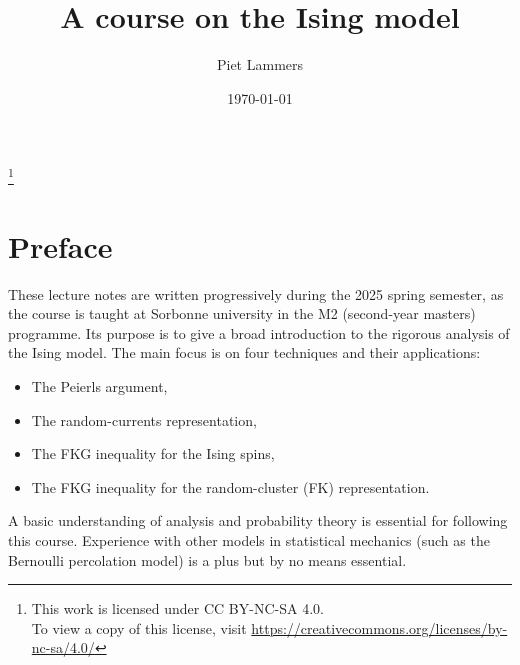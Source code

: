 % 


\makeatletter
{}
\makeatother

\title{A course on the Ising model}

\author{Piet Lammers}
\address{CNRS and Sorbonne Université, LPSM}

\date{\today}

\newcommand\n{\mathbf{n}}
\newcommand\m{\mathbf{m}}
\newcommand\s{\mathbf{s}}
\renewcommand\a{\mathbf{a}}
\renewcommand\b{\mathbf{b}}
\newcommand\f{{\operatorname{f}}}
\newcommand\bfM{\mathbf{M}}
\newcommand\bfP{\mathbf{P}}

\thanks{This work is licensed under CC BY-NC-SA 4.0.\\\indent To view a copy of this
license, visit \url{https://creativecommons.org/licenses/by-nc-sa/4.0/}}



\maketitle

\tableofcontents

\section*{Preface}
These lecture notes are written progressively during the 2025 spring semester,
as the course is taught at Sorbonne university in the M2 (second-year masters) programme.
Its purpose is to give a broad introduction to the rigorous analysis of the Ising model.
The main focus is on four techniques and their applications:
\begin{itemize}
    \item The Peierls argument,
    \item The random-currents representation,
    \item The FKG inequality for the Ising spins,
    \item The FKG inequality for the random-cluster (FK) representation.
\end{itemize}

A basic understanding of analysis and probability theory is essential for following this course.
Experience with other models in statistical mechanics (such as the Bernoulli percolation model)
is a plus but by no means essential.

